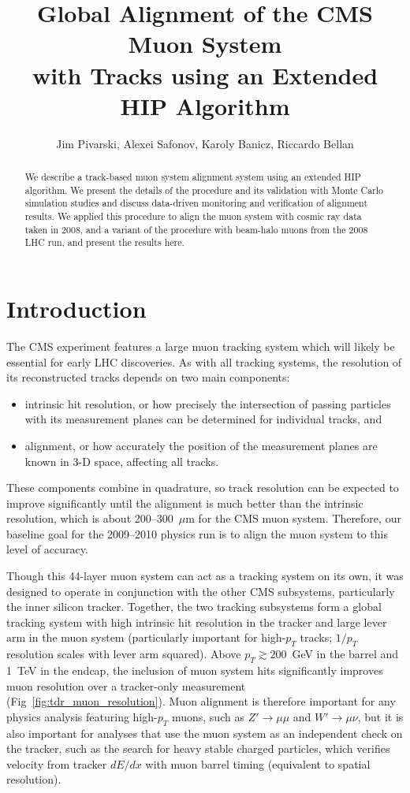 \documentclass[12pt]{article}
\title{Global Alignment of the CMS Muon System \\ with Tracks using an Extended HIP Algorithm}
\author{Jim Pivarski, Alexei Safonov, Karoly Banicz, Riccardo Bellan}
\begin{document}
\maketitle
\begin{abstract}
We describe a track-based muon system alignment system using an
extended HIP algorithm.  We present the details of the procedure and
its validation with Monte Carlo simulation studies and discuss
data-driven monitoring and verification of alignment results.  We
applied this procedure to align the muon system with cosmic ray data
taken in 2008, and a variant of the procedure with beam-halo muons
from the 2008 LHC run, and present the results here.
\end{abstract}
\pagebreak

\tableofcontents
\pagebreak

\section{Introduction}

The CMS experiment features a large muon tracking system which will
likely be essential for early LHC discoveries.  As with all tracking
systems, the resolution of its reconstructed tracks depends on two
main components:
\begin{itemize}
\item intrinsic hit resolution, or how precisely the intersection of
  passing particles with its measurement planes can be determined for
  individual tracks, and
\item alignment, or how accurately the position of the measurement
  planes are known in 3-D space, affecting all tracks.
\end{itemize}
These components combine in quadrature, so track resolution can be
expected to improve significantly until the alignment is much better
than the intrinsic resolution, which is about 200--300~$\mu$m for the
CMS muon system.  Therefore, our baseline goal for the 2009--2010
physics run is to align the muon system to this level of accuracy.

Though this 44-layer muon system can act as a tracking system on its
own, it was designed to operate in conjunction with the other CMS
subsystems, particularly the inner silicon tracker.  Together, the two
tracking subsystems form a global tracking system with high intrinsic
hit resolution in the tracker and large lever arm in the muon system
(particularly important for high-$p_T$ tracks; $1/p_T$ resolution
scales with lever arm squared).  Above $p_T \gtrsim 200$~GeV in the
barrel and 1~TeV in the endcap, the inclusion of muon system hits
significantly improves muon resolution over a tracker-only measurement
(Fig~\ref{fig:tdr_muon_resolution}).  Muon alignment is therefore
important for any physics analysis featuring high-$p_T$ muons, such as
$Z' \to \mu\mu$ and $W' \to \mu\nu$, but it is also important for
analyses that use the muon system as an independent check on the
tracker, such as the search for heavy stable charged particles, which
verifies velocity from tracker $dE/dx$ with muon barrel timing
(equivalent to spatial resolution).
\end{document}
